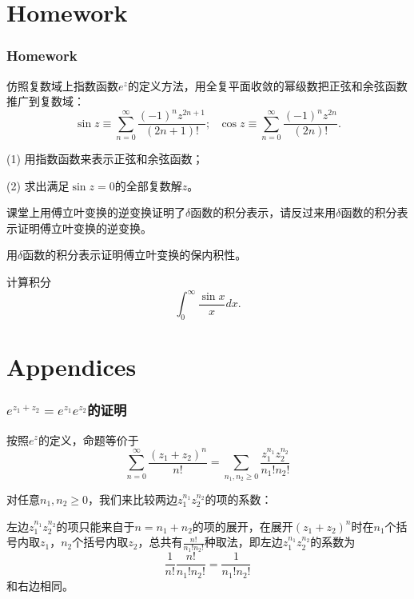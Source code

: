 \documentclass[CJK,13pt]{beamer}
\begin{document}

\section{Homework}

\begin{frame}
  \frametitle{Homework}
  \bitem
  \item{仿照复数域上指数函数$e^z$的定义方法，用全复平面收敛的幂级数把正弦和余弦函数推广到复数域：
  $$\sin z \equiv \sum_{n=0}^\infty \frac{(-1)^nz^{2n+1}}{(2n+1)!};\ \ \ \cos z \equiv \sum_{n=0}^\infty \frac{(-1)^nz^{2n}}{(2n)!}.$$
  \bitem
  \item[(1)]{ 用指数函数来表示正弦和余弦函数；}
  \item[(2)]{ 求出满足$\sin z = 0$的全部复数解$z$。}
    \eitem}
\item{课堂上用傅立叶变换的逆变换证明了$\delta$函数的积分表示，请反过来用$\delta$函数的积分表示证明傅立叶变换的逆变换。}
\item{用$\delta$函数的积分表示证明傅立叶变换的保内积性。}
\item{计算积分$$\int_0^\infty \frac{\sin x}{x} dx.$$}    
  \eitem
\end{frame}


\section{Appendices}


\begin{frame}
  \frametitle{$e^{z_1+z_2} = e^{z_1}e^{z_2}$的证明}
  
  按照$e^z$的定义，命题等价于
  $$\sum_{n=0}^\infty \frac{(z_1+z_2)^n}{n!} = \sum_{n_1, n_2\ge 0}\frac{z_1^{n_1}z_2^{n_2}}{n_1!n_2!}$$

  对任意$n_1,n_2\ge0$，我们来比较两边$z_1^{n_1}z_2^{n_2}$的项的系数：
  
  左边$z_1^{n_1}z_2^{n_2}$的项只能来自于$n=n_1+n_2$的项的展开，在展开$(z_1+z_2)^n$时在$n_1$个括号内取$z_1$，$n_2$个括号内取$z_2$，总共有$\frac{n!}{n_1!n_2!}$种取法，即左边$z_1^{n_1}z_2^{n_2}$的系数为
  $$\frac{1}{n!} \frac{n!}{n_1!n_2!} = \frac{1}{n_1!n_2!}$$
  和右边相同。
  
\end{frame}


\end{document}
